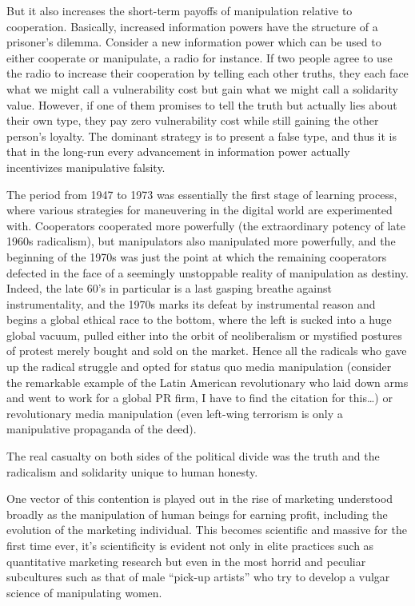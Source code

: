 \documentclass[12pt,book]{article}
\begin{document}
But it also increases the short-term payoffs of manipulation relative to
cooperation. Basically, increased information powers have the structure
of a prisoner's dilemma. Consider a new information power which can be
used to either cooperate or manipulate, a radio for instance. If two
people agree to use the radio to increase their cooperation by telling
each other truths, they each face what we might call a vulnerability
cost but gain what we might call a solidarity value. However, if one of
them promises to tell the truth but actually lies about their own type,
they pay zero vulnerability cost while still gaining the other person's
loyalty. The dominant strategy is to present a false type, and thus it
is that in the long-run every advancement in information power actually
incentivizes manipulative falsity.

The period from 1947 to 1973 was essentially the first stage of learning
process, where various strategies for maneuvering in the digital world
are experimented with. Cooperators cooperated more powerfully (the
extraordinary potency of late 1960s radicalism), but manipulators also
manipulated more powerfully, and the beginning of the 1970s was just the
point at which the remaining cooperators defected in the face of a
seemingly unstoppable reality of manipulation as destiny. Indeed, the
late 60's in particular is a last gasping breathe against
instrumentality, and the 1970s marks its defeat by instrumental reason
and begins a global ethical race to the bottom, where the left is sucked
into a huge global vacuum, pulled either into the orbit of neoliberalism
or mystified postures of protest merely bought and sold on the market.
Hence all the radicals who gave up the radical struggle and opted for
status quo media manipulation (consider the remarkable example of the
Latin American revolutionary who laid down arms and went to work for a
global PR firm, I have to find the citation for this\ldots{}) or
revolutionary media manipulation (even left-wing terrorism is only a
manipulative propaganda of the deed).

The real casualty on both sides of the political divide was the truth
and the radicalism and solidarity unique to human honesty.

One vector of this contention is played out in the rise of marketing
understood broadly as the manipulation of human beings for earning
profit, including the evolution of the marketing individual. This
becomes scientific and massive for the first time ever, it's
scientificity is evident not only in elite practices such as
quantitative marketing research but even in the most horrid and peculiar
subcultures such as that of male ``pick-up artists'' who try to develop
a vulgar science of manipulating women.
\end{document}
